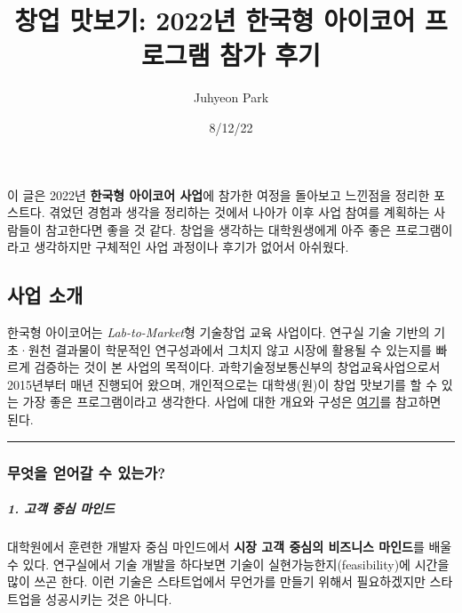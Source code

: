 \documentclass[
  letterpaper,
  DIV=11,
  numbers=noendperiod]{scrartcl}
\title{창업 맛보기: 2022년 한국형 아이코어 프로그램 참가 후기}
\author{Juhyeon Park}
\date{8/12/22}
\let\oldsubparagraph\subparagraph
\renewcommand{\subparagraph}[1]{\oldsubparagraph{#1}\mbox{}}
\renewcommand*\contentsname{Table of contents}
\newcommand\contentsname{Table of contents}
\begin{document}
\maketitle
\ifdefined\Shaded\renewenvironment{Shaded}{\begin{tcolorbox}[breakable, interior hidden, sharp corners, borderline west={3pt}{0pt}{shadecolor}, enhanced, boxrule=0pt, frame hidden]}{\end{tcolorbox}}\fi

\renewcommand*\contentsname{Table of contents}
{
\hypersetup{linkcolor=}
\setcounter{tocdepth}{3}
\tableofcontents
}
이 글은 2022년 \textbf{한국형 아이코어 사업}에 참가한 여정을 돌아보고
느낀점을 정리한 포스트다. 겪었던 경험과 생각을 정리하는 것에서 나아가
이후 사업 참여를 계획하는 사람들이 참고한다면 좋을 것 같다. 창업을
생각하는 대학원생에게 아주 좋은 프로그램이라고 생각하지만 구체적인 사업
과정이나 후기가 없어서 아쉬웠다.

\hypertarget{uxc0acuxc5c5-uxc18cuxac1c}{%
\subsection{사업 소개}\label{uxc0acuxc5c5-uxc18cuxac1c}}

한국형 아이코어는 \emph{Lab-to-Market}형 기술창업 교육 사업이다. 연구실
기술 기반의 기초·원천 결과물이 학문적인 연구성과에서 그치지 않고 시장에
활용될 수 있는지를 빠르게 검증하는 것이 본 사업의 목적이다.
과학기술정보통신부의 창업교육사업으로서 2015년부터 매년 진행되어 왔으며,
개인적으로는 대학생(원)이 창업 맛보기를 할 수 있는 가장 좋은
프로그램이라고 생각한다. 사업에 대한 개요와 구성은
\href{https://www.youtube.com/watch?v=tSCnQgSxoNo\&t=839s}{여기}를
참고하면 된다.

\begin{center}\rule{0.5\linewidth}{0.5pt}\end{center}

\hypertarget{uxbb34uxc5c7uxc744-uxc5bbuxc5b4uxac08-uxc218-uxc788uxb294uxac00}{%
\subsubsection{무엇을 얻어갈 수
있는가?}\label{uxbb34uxc5c7uxc744-uxc5bbuxc5b4uxac08-uxc218-uxc788uxb294uxac00}}

\hypertarget{uxace0uxac1d-uxc911uxc2ec-uxb9c8uxc778uxb4dc}{%
\subparagraph{1. 고객 중심
마인드}\label{uxace0uxac1d-uxc911uxc2ec-uxb9c8uxc778uxb4dc}}

대학원에서 훈련한 개발자 중심 마인드에서 \textbf{시장 고객 중심의
비즈니스 마인드}를 배울 수 있다. 연구실에서 기술 개발을 하다보면 기술이
실현가능한지(feasibility)에 시간을 많이 쓰곤 한다. 이런 기술은
스타트업에서 무언가를 만들기 위해서 필요하겠지만 스타트업을 성공시키는
것은 아니다.
\end{document}
